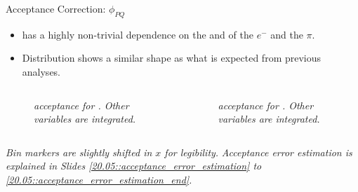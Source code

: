 \begin{frame}{Acceptance Correction: $\phi_{PQ}$}
    \label{11.56::phipq}

    \begin{itemize}
        \item
             has a highly non-trivial dependence on the \ef{$\theta$} and \ef{$\varphi$} of the $e^-$ and the $\pi$.

        \vspace{6pt}
        \item
            Distribution shows a similar shape as what is expected from previous analyses.
    \end{itemize}

    \vspace{-12pt}
    \begin{columns}
        \begin{column}{.49\linewidth}
            \begin{center}
                \begin{figure}[t]
                    \scriptsize{\textit{
                         acceptance for \ef{$\pi^-$}.
                        Other variables are integrated.
                    }}
                \end{figure}
            \end{center}
        \end{column}

        \begin{column}{.49\linewidth}
            \begin{center}
                \begin{figure}[t]
                    \scriptsize{\textit{
                         acceptance for \ef{$\pi^+$}.
                        Other variables are integrated.
                    }}
                \end{figure}
            \end{center}
        \end{column}
    \end{columns}

    \begin{flushright}
        \tiny{\textit{Bin markers are slightly shifted in $x$ for legibility.}}
        \tiny{\textit{Acceptance error estimation is explained in Slides \textcolor{efd_purple}{\ref{20.05::acceptance_error_estimation}} to \textcolor{efd_purple}{\ref{20.05::acceptance_error_estimation_end}}.}}
    \end{flushright}
\end{frame}

